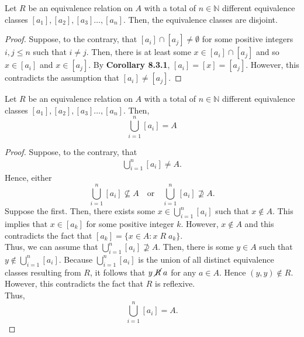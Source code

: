 \documentclass[12pt]{article}
\newcommand{\N}{\mathbb{N}}
\newenvironment{lemma}[2][Lemma]{\begin{trivlist}
		\item[\hskip \labelsep {\bfseries #1}\hskip \labelsep {\bfseries #2.}]}{\end{trivlist}}
\newenvironment{corollary}[2][Corollary]{\begin{trivlist}
		\item[\hskip \labelsep {\bfseries #1}\hskip \labelsep {\bfseries #2.}]}{\end{trivlist}}
\begin{document}
	\begin{corollary}{8.3.2}
		Let $R$ be an equivalence relation on $A$ with a total of $n\in \N$ different equivalence classes $[a_{1}],[a_{2}],[a_{3}]\ldots, [a_{n}]$. Then, the equivalence classes are disjoint.
		\begin{proof}
			Suppose, to the contrary, that $[a_{i}]\cap [a_{j}]\neq \emptyset$ for some positive integers $i,j\leq n$ such that $i\neq j$. Then, there is at least some $x\in [a_{i}]\cap [a_{j}]$ and so $x\in [a_{i}]$ and $x\in [a_{j}]$. By \textbf{Corollary 8.3.1}, $[a_{i}] = [x] = [a_{j}]$. However, this contradicts the assumption that $[a_{i}] \neq [a_{j}]$.
		\end{proof}
	\end{corollary}

	\begin{lemma}{8.3.2}
		Let $R$ be an equivalence relation on $A$ with a total of $n\in \N$ different equivalence classes $[a_{1}],[a_{2}],[a_{3}]\ldots, [a_{n}]$. Then, 
		\begin{equation*}
			\bigcup_{i=1}^{n} [a_{i}] = A
		\end{equation*}
		\begin{proof}
			Suppose, to the contrary, that 
			\begin{align*}
				\bigcup_{i=1}^{n} [a_{i}] \neq A.
			\end{align*}
		Hence, either 
		\begin{equation*}
			\bigcup_{i=1}^{n} [a_{i}] \not\subseteq A \quad \text{or} \quad \bigcup_{i=1}^{n} [a_{i}] \not\supseteq A.
		\end{equation*}
	 Suppose the first. Then, there exists some $x\in \bigcup_{i=1}^{n} [a_{i}]$ such that $x\not\in A$. This implies that $x\in [a_{k}]$ for some positive integer $k$. However, $x\not\in A$ and this contradicts the fact that $[a_{k}] = \{x\in A: x\; R \;a_{k}\}$. \\
	 
	 Thus, we can assume that $\bigcup_{i=1}^{n} [a_{i}] \not\supseteq A$. Then, there is some $y\in A$ such that $y\not\in \bigcup_{i=1}^{n} [a_{i}]$. Because $\bigcup_{i=1}^{n} [a_{i}]$ is the union of all distinct equivalence classes resulting from $R$, it follows that $y \; \cancel R \; a$ for any $a\in A$. Hence $(y,y) \not\in R$. However, this contradicts the fact that $R$ is reflexive.\\
	 
	 Thus, 
	 \begin{equation*}
	 	\bigcup_{i=1}^{n} [a_{i}] = A.
	 \end{equation*} 
		\end{proof}
	\end{lemma}
\end{document}
